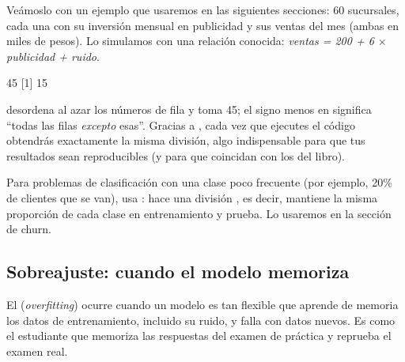 Veámoslo con un ejemplo que usaremos en las siguientes secciones: 60
sucursales, cada una con su inversión mensual en publicidad y sus ventas del
mes (ambas en miles de pesos). Lo simulamos con una relación conocida:
\emph{ventas = 200 + 6 $\times$ publicidad + ruido}.


\begin{rsalida}
[1] 45
[1] 15
\end{rsalida}

 desordena al azar los números de fila y toma 45; el signo
menos en  significa ``todas las filas
\emph{excepto} esas''. Gracias a , cada vez que ejecutes el
código obtendrás exactamente la misma división, algo indispensable para que tus
resultados sean reproducibles (y para que coincidan con los del libro).

\begin{consejo}
Para problemas de clasificación con una clase poco frecuente (por ejemplo, 20\%
de clientes que se van), usa : hace una
división , es decir, mantiene la misma proporción de cada
clase en entrenamiento y prueba. Lo usaremos en la sección de churn.
\end{consejo}

\subsection{Sobreajuste: cuando el modelo memoriza}
\label{sec:m7-sobreajuste}

El  (\emph{overfitting}) ocurre cuando un modelo es tan
flexible que aprende de memoria los datos de entrenamiento, incluido su ruido,
y falla con datos nuevos. Es como el estudiante que memoriza las respuestas del
examen de práctica y reprueba el examen real.

